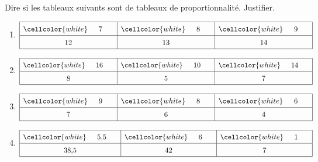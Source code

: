 \documentclass[11pt]{article}
\begin{document}
\phantom{0}
\vspace{-1.5cm}

\begin{center}
\brouillon
\recherche 
{}
\end{center}

\begin{exercicedevoir}
Dire si les tableaux suivants sont de tableaux de proportionnalité. Justifier.
\begin{multicols}{2}
\begin{enumerate}[itemsep=2em]
\item $\renewcommand{\arraystretch}{1.5}
\begin{array}{|c|c|c|}
\hline
\cellcolor{white} \phantom{000}7\phantom{000} & \cellcolor{white} \phantom{000}8\phantom{000} & \cellcolor{white} \phantom{000}9\phantom{000}\\
\hline
12 & 13 & 14\\
\hline
\end{array}
\renewcommand{\arraystretch}{1}$

\item $\renewcommand{\arraystretch}{1.5}
\begin{array}{|c|c|c|}
\hline
\cellcolor{white} \phantom{000}16\phantom{000} & \cellcolor{white} \phantom{000}10\phantom{000} & \cellcolor{white} \phantom{000}14\phantom{000}\\
\hline
8 & 5 & 7\\
\hline
\end{array}
\renewcommand{\arraystretch}{1.5}$

\item $\renewcommand{\arraystretch}{1.5}
\begin{array}{|c|c|c|}
\hline
\cellcolor{white} \phantom{000}9\phantom{000} & \cellcolor{white} \phantom{000}8\phantom{000} & \cellcolor{white} \phantom{000}6\phantom{000}\\
\hline
7 & 6 & 4\\
\hline
\end{array}
\renewcommand{\arraystretch}{1.5}$

\item $\renewcommand{\arraystretch}{1.5}
\begin{array}{|c|c|c|}
\hline
\cellcolor{white} \phantom{000}5{,}5\phantom{000} & \cellcolor{white} \phantom{000}6\phantom{000} & \cellcolor{white} \phantom{000}1\phantom{000}\\
\hline
38{,}5 & 42 & 7\\
\hline
\end{array}
\renewcommand{\arraystretch}{1.5}$
\end{enumerate}
\end{multicols}

\end{exercicedevoir}
\end{document}

